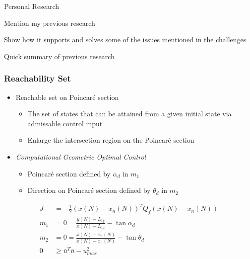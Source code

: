 
\begin{frame}{Personal Research}

Mention my previous research

Show how it supports and solves some of the issues mentioned in the challenges

Quick summary of previous research
\end{frame}

\begin{frame} %
\frametitle{Reachability Set}
  \begin{itemize}
  \item Reachable set on Poincar\'e section
        \begin{itemize}
            \item The set of states that can be attained from a given initial state via admissable control input
            \item Enlarge the intersection region on the Poincar\'e section
        \end{itemize}
  \item \emph{Computational Geometric Optimal Control}
    \begin{itemize}
        \item Poincar\'e section defined by \( \alpha_d \) in \( m_1\)
        \item Direction on Poincar\'e section defined by \( \theta_d \) in \( m_2 \)
    \end{itemize}
 \end{itemize}
  \begin{align*}
    J &= -\frac{1}{2} \left( \bar{x}(N) - \bar{x}_{n}(N)\right)^T Q_f\left( \bar{x}(N) - \bar{x}_{n}(N)\right)\\
    m_1 &= 0 = \frac{y(N) - L_{1y}}{x(N) - L_{1x}} - \tan{\alpha_d} \\ 
    m_2&= 0 = \frac{\dot{x}(N) - \dot{x_n}(N) }{x(N) -x_n(N) } - \tan{\theta_d} \\
     0 &\geq\bar{u}^T \bar{u} - u_{max}^2 
    \end{align*}

\end{frame}   %

